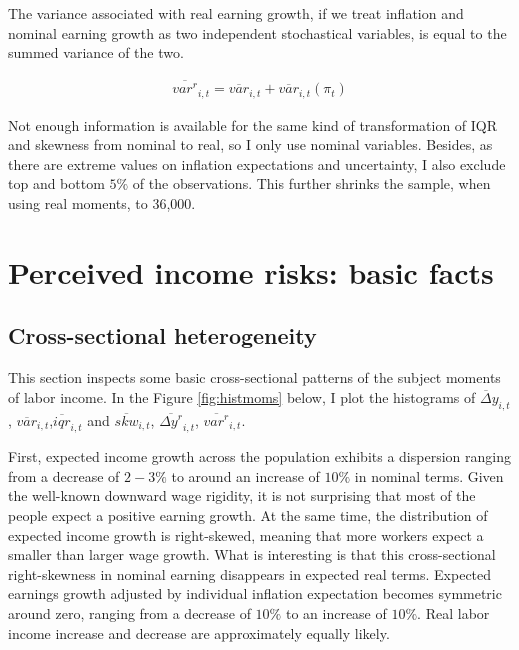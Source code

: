 \documentclass[12pt,notitlepage,onecolumn,aps,pra]{article}
\begin{document}
The variance associated with real earning growth, if we treat inflation
and nominal earning growth as two independent stochastical variables, is
equal to the summed variance of the two.

\begin{eqnarray}
\overline{var^{r}}_{i,t} = \overline{var}_{i,t} + \overline{var}_{i,t}(\pi_{t})
\end{eqnarray}

Not enough information is available for the same kind of transformation
of IQR and skewness from nominal to real, so I only use nominal
variables. Besides, as there are extreme values on inflation
expectations and uncertainty, I also exclude top and bottom \(5\%\) of
the observations. This further shrinks the sample, when using real
moments, to 36,000.

    \hypertarget{perceived-income-risks-basic-facts}{%
\section{Perceived income risks: basic
facts}\label{perceived-income-risks-basic-facts}}

\hypertarget{cross-sectional-heterogeneity}{%
\subsection{Cross-sectional
heterogeneity}\label{cross-sectional-heterogeneity}}

This section inspects some basic cross-sectional patterns of the subject
moments of labor income. In the Figure \ref{fig:histmoms} below, I plot
the histograms of \(\overline\Delta y_{i,t}\),
\(\overline{var}_{i,t}\),\(\overline{iqr}_{i,t}\) and
\(\overline {skw}_{i,t}\), \(\overline {\Delta y^{r}}_{i,t}\),
\(\overline{var^{r}}_{i,t}\).

First, expected income growth across the population exhibits a
dispersion ranging from a decrease of \(2-3\%\) to around an increase of
\(10\%\) in nominal terms. Given the well-known downward wage rigidity,
it is not surprising that most of the people expect a positive earning
growth. At the same time, the distribution of expected income growth is
right-skewed, meaning that more workers expect a smaller than larger
wage growth. What is interesting is that this cross-sectional
right-skewness in nominal earning disappears in expected real terms.
Expected earnings growth adjusted by individual inflation expectation
becomes symmetric around zero, ranging from a decrease of \(10\%\) to an
increase of \(10\%\). Real labor income increase and decrease are
approximately equally likely.
\end{document}
